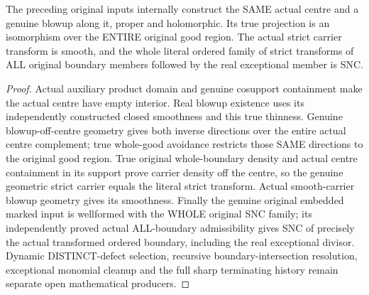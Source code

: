 \begin{theorem}
\label{hir:sharp-original-deep-product-first-actual-blowup-geometry}
\leanok
The preceding original inputs internally construct the SAME actual centre and a genuine blowup along it, proper and holomorphic. Its true projection is an isomorphism over the ENTIRE original good region. The actual strict carrier transform is smooth, and the whole literal ordered family of strict transforms of ALL original boundary members followed by the real exceptional member is SNC.
\end{theorem}
\begin{proof}
Actual auxiliary product domain and genuine cosupport containment make the actual centre have empty interior. Real blowup existence uses its independently constructed closed smoothness and this true thinness. Genuine blowup-off-centre geometry gives both inverse directions over the entire actual centre complement; true whole-good avoidance restricts those SAME directions to the original good region. True original whole-boundary density and actual centre containment in its support prove carrier density off the centre, so the genuine geometric strict carrier equals the literal strict transform. Actual smooth-carrier blowup geometry gives its smoothness. Finally the genuine original embedded marked input is wellformed with the WHOLE original SNC family; its independently proved actual ALL-boundary admissibility gives SNC of precisely the actual transformed ordered boundary, including the real exceptional divisor. Dynamic DISTINCT-defect selection, recursive boundary-intersection resolution, exceptional monomial cleanup and the full sharp terminating history remain separate open mathematical producers.
\end{proof}
